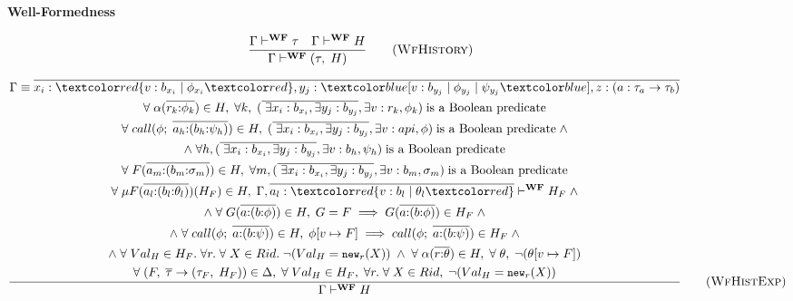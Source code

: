 \begin{figure}[H]
    \textbf{Well-Formedness}
    
    \begin{equation}
        \frac{
            \Gamma \vdash^{\textbf{WF}} \tau \quad \Gamma \vdash^{\textbf{WF}} H
        }{
            \Gamma \vdash^{\textbf{WF}} (\tau, \; H)
        }
        \tag{\textsc{WfHistory}}
        \label{eq:wfhistory}
    \end{equation}
    
    \begin{equation}
        \frac{
            \begin{gathered}
                \Gamma \equiv \overline{x_i:\overa{v: b_{x_i} \;|\; \phi_{x_i}}, y_j:\under{v: b_{y_j} \;|\; \phi_{y_j} \;|\; \psi_{y_j}}, z:(a:\tau_a \rightarrow \tau_b)} \\
                \forall \; \alpha(\overline{r_k{:}\phi_k}) \in H, \; \forall k, \;(\overline{\;\exists x_i:b_{x_i}, \exists y_j : b_{y_j}}, \exists v : r_k, \phi_k) \; \text{is a Boolean predicate} \\
                \forall \; call(\phi; \;\overline{a_h{:}(b_h{:}\psi_h)}) \in H, \;(\overline{\;\exists x_i:b_{x_i}, \exists y_j : b_{y_j}}, \exists v : api, \phi) \;\text{is a Boolean predicate} \;\land \\
                \land\; \forall h, (\overline{\;\exists x_i:b_{x_i}, \exists y_j : b_{y_j}}, \exists v : b_h, \psi_h) \;\text{is a Boolean predicate} \\
                \forall \; F(\overline{a_m{:}(b_m{:}\sigma_m)}) \in H, \; \forall m, (\overline{\;\exists x_i:b_{x_i}, \exists y_j : b_{y_j}}, \exists v : b_m, \sigma_m) \;\text{is a Boolean predicate} \\
                \forall \;\mu F(\overline{a_l{:}({b_l{:}\theta_l})})(H_F) \in H, \; \Gamma, \overline{a_l: \overa{v: b_l \;|\; \theta_l}} \vdash^{\textbf{WF}} H_F \;\land \\
                \land\; \forall \;G(\overline{a{:}(b{:}\phi)}) \in H, \;G = F \;\Longrightarrow\; G(\overline{a{:}(b{:}\phi)}) \in H_F \;\land \\ \land\; \forall \;call(\phi; \;\overline{a{:}(b{:}\psi)}) \in H, \;\phi[v \mapsto F] \;\Longrightarrow\; call(\phi; \;\overline{a{:}(b{:}\psi)}) \in H_F \;\land \\
                \land\; \forall \;Val_H \in H_F. \;\forall r. \;\forall \;X \in Rid. \;\neg(Val_H = \texttt{\small{new}}_r(X)) \;\land\; \forall \;\alpha(\overline{r{:}\theta}) \in H, \;\forall \;\theta, \;\neg(\theta[v \mapsto F]) \\
                \forall \;(F, \;\overline{\tau} \rightarrow (\tau_F, \;H_F)) \in \Delta, \;\forall \;Val_H \in H_F, \;\forall r. \;\forall \;X \in Rid, \;\neg(Val_H = \texttt{\small{new}}_r(X)) \\
            \end{gathered} 
        }{
            \Gamma \vdash^{\textbf{WF}} H
        }
        \tag{\textsc{WfHistExp}}
        \label{eq:wfhexp}
    \end{equation}
    

\end{figure}

